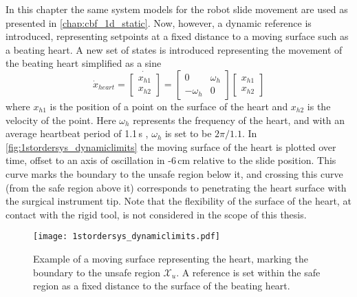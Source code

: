 In this chapter the same system models for the robot slide movement are used as presented in \autoref{chap:cbf_1d_static}. Now, however, a dynamic reference is introduced, representing setpoints at a fixed distance to a moving surface such as a beating heart. A new set of states is introduced representing the movement of the beating heart simplified as a sine
\begin{equation}
\dot{x}_{heart} =
\dot{\begin{bmatrix}
x_{h1}\\x_{h2}
\end{bmatrix}} =
\begin{bmatrix}
0 & \omega_h \\ -\omega_h & 0
\end{bmatrix}
\begin{bmatrix}
x_{h1}\\x_{h2}
\end{bmatrix}
\label{eq:beating_heart_sine}
\end{equation}
where $x_{h1}$ is the position of a point on the surface of the heart and $x_{h2}$ is the velocity of the point.
Here $\omega_h$ represents the frequency of the heart, and with an average heartbeat period of 1.1\,s \citep{bib:heart_berkeley}, $\omega_h$ is set to be $2\pi/1.1$. In \autoref{fig:1stordersys_dynamiclimits} the moving surface of the heart is plotted over time, offset to an axis of oscillation in -6\,cm relative to the slide position. This curve marks the boundary to the unsafe region below it, and crossing this curve (from the safe region above it) corresponds to penetrating the heart surface with the surgical instrument tip. Note that the flexibility of the surface of the heart, at contact with the rigid tool, is not considered in the scope of this thesis. 

\begin{figure}[htbp]
	\centering
	\texttt{[image: 1stordersys\_dynamiclimits.pdf]}
	\caption{Example of a moving surface representing the heart, marking the boundary to the unsafe region $\mathcal{X}_u$. A reference is set within the safe region as a fixed distance to the surface of the beating heart.}
	\label{fig:1stordersys_dynamiclimits}
\end{figure}

